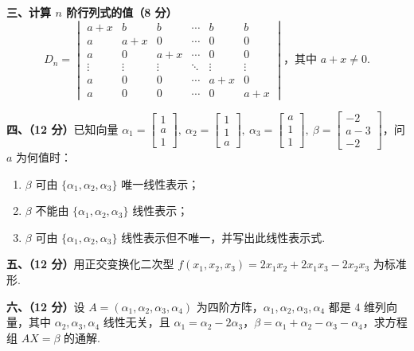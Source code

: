 \documentclass[a4paper,11pt]{ctexart}
\begin{document}
\textbf{三、计算 $n$ 阶行列式的值（8 分）}
\[
  D_n = \begin{vmatrix}
    a+x & b & b & \cdots & b & b \\
    a & a+x & 0 & \cdots & 0 & 0 \\
    a & 0 & a+x & \cdots & 0 & 0 \\
    \vdots & \vdots & \vdots & \ddots & \vdots & \vdots \\
    a & 0 & 0 & \cdots & a+x & 0 \\
    a & 0 & 0 & \cdots & 0 & a+x
  \end{vmatrix} \text{，其中 } a + x \neq 0.
\]

\vspace{0.8em}

\textbf{四、（12 分）}已知向量 $\alpha_1 = \begin{bmatrix} 1 \\ a \\ 1 \end{bmatrix},\ \alpha_2 = \begin{bmatrix} 1 \\ 1 \\ a \end{bmatrix},\ \alpha_3 = \begin{bmatrix} a \\ 1 \\ 1 \end{bmatrix},\ \beta = \begin{bmatrix} -2 \\ a - 3 \\ -2 \end{bmatrix}$，问 $a$ 为何值时：
\begin{enumerate}[label=(\arabic*), leftmargin=2.4em, itemsep=0.25em, topsep=0.3em]
  \item $\beta$ 可由 $\{\alpha_1, \alpha_2, \alpha_3\}$ 唯一线性表示；
  \item $\beta$ 不能由 $\{\alpha_1, \alpha_2, \alpha_3\}$ 线性表示；
  \item $\beta$ 可由 $\{\alpha_1, \alpha_2, \alpha_3\}$ 线性表示但不唯一，并写出此线性表示式.
\end{enumerate}

\vspace{0.8em}

\textbf{五、（12 分）}用正交变换化二次型 $f(x_1, x_2, x_3) = 2x_1 x_2 + 2x_1 x_3 - 2x_2 x_3$ 为标准形.

\vspace{0.8em}

\textbf{六、（12 分）}设 $A = (\alpha_1, \alpha_2, \alpha_3, \alpha_4)$ 为四阶方阵，$\alpha_1, \alpha_2, \alpha_3, \alpha_4$ 都是 $4$ 维列向量，其中 $\alpha_2, \alpha_3, \alpha_4$ 线性无关，且 $\alpha_1 = \alpha_2 - 2\alpha_3$，$\beta = \alpha_1 + \alpha_2 - \alpha_3 - \alpha_4$，求方程组 $AX = \beta$ 的通解.
\end{document}
